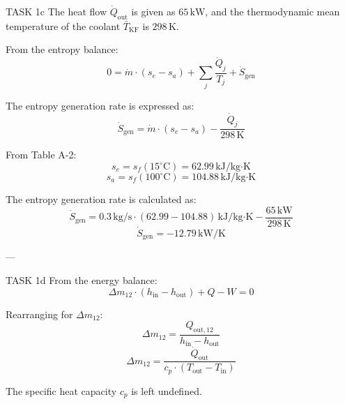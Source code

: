 TASK 1c  
The heat flow \( \dot{Q}_{\text{out}} \) is given as \( 65 \, \text{kW} \), and the thermodynamic mean temperature of the coolant \( \bar{T}_{\text{KF}} \) is \( 298 \, \text{K} \).  

From the entropy balance:  
\[
0 = \dot{m} \cdot (s_e - s_a) + \sum_j \frac{\dot{Q}_j}{T_j} + \dot{S}_{\text{gen}}
\]  

The entropy generation rate is expressed as:  
\[
\dot{S}_{\text{gen}} = \dot{m} \cdot (s_e - s_a) - \frac{\dot{Q}_j}{298 \, \text{K}}
\]  

From Table A-2:  
\[
s_e = s_f(15^\circ\text{C}) = 62.99 \, \text{kJ/kg·K}
\]  
\[
s_a = s_f(100^\circ\text{C}) = 104.88 \, \text{kJ/kg·K}
\]  

The entropy generation rate is calculated as:  
\[
\dot{S}_{\text{gen}} = 0.3 \, \text{kg/s} \cdot (62.99 - 104.88) \, \text{kJ/kg·K} - \frac{65 \, \text{kW}}{298 \, \text{K}}
\]  
\[
\dot{S}_{\text{gen}} = -12.79 \, \text{kW/K}
\]  

---

TASK 1d  
From the energy balance:  
\[
\Delta m_{12} \cdot (h_{\text{in}} - h_{\text{out}}) + Q - W = 0
\]  

Rearranging for \( \Delta m_{12} \):  
\[
\Delta m_{12} = \frac{Q_{\text{out},12}}{h_{\text{in}} - h_{\text{out}}}
\]  
\[
\Delta m_{12} = \frac{\dot{Q}_{\text{out}}}{c_p \cdot (T_{\text{out}} - T_{\text{in}})}
\]  

The specific heat capacity \( c_p \) is left undefined.